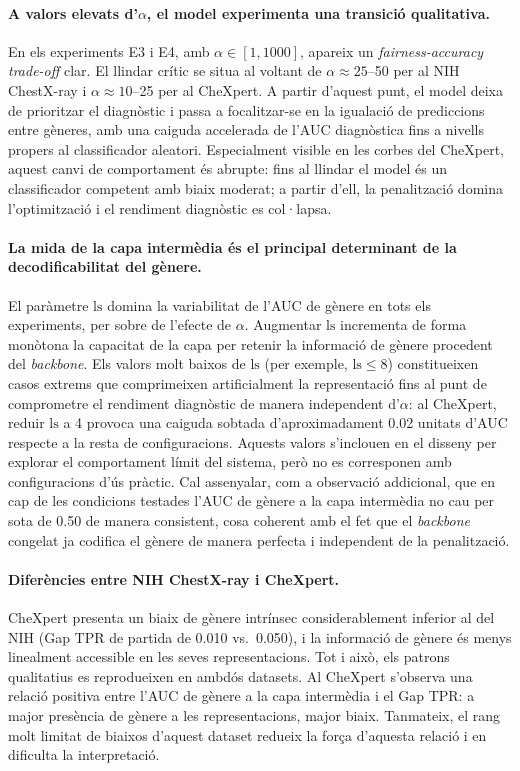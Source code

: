 \documentclass[a4paper,12pt,twoside]{ThesisStyle}
\begin{document}
\paragraph{A valors elevats d'$\alpha$, el model experimenta una transició qualitativa.}
En els experiments E3 i E4, amb $\alpha \in [1, 1000]$, apareix un \textit{fairness-accuracy trade-off} clar. El llindar crític se situa al voltant de $\alpha \approx 25$--50 per al NIH ChestX-ray i $\alpha \approx 10$--25 per al CheXpert. A partir d'aquest punt, el model deixa de prioritzar el diagnòstic i passa a focalitzar-se en la igualació de prediccions entre gèneres, amb una caiguda accelerada de l'AUC diagnòstica fins a nivells propers al classificador aleatori. Especialment visible en les corbes del CheXpert, aquest canvi de comportament és abrupte: fins al llindar el model és un classificador competent amb biaix moderat; a partir d'ell, la penalització domina l'optimització i el rendiment diagnòstic es col·lapsa.

\paragraph{La mida de la capa intermèdia és el principal determinant de la decodificabilitat del gènere.}
El paràmetre $\text{ls}$ domina la variabilitat de l'AUC de gènere en tots els experiments, per sobre de l'efecte de $\alpha$. Augmentar $\text{ls}$ incrementa de forma monòtona la capacitat de la capa per retenir la informació de gènere procedent del \textit{backbone}. Els valors molt baixos de $\text{ls}$ (per exemple, $\text{ls} \leq 8$) constitueixen casos extrems que comprimeixen artificialment la representació fins al punt de comprometre el rendiment diagnòstic de manera independent d'$\alpha$: al CheXpert, reduir $\text{ls}$ a 4 provoca una caiguda sobtada d'aproximadament 0.02 unitats d'AUC respecte a la resta de configuracions. Aquests valors s'inclouen en el disseny per explorar el comportament límit del sistema, però no es corresponen amb configuracions d'ús pràctic. Cal assenyalar, com a observació addicional, que en cap de les condicions testades l'AUC de gènere a la capa intermèdia no cau per sota de 0.50 de manera consistent, cosa coherent amb el fet que el \textit{backbone} congelat ja codifica el gènere de manera perfecta i independent de la penalització.

\paragraph{Diferències entre NIH ChestX-ray i CheXpert.}
CheXpert presenta un biaix de gènere intrínsec considerablement inferior al del NIH (Gap TPR de partida de 0.010 vs.\ 0.050), i la informació de gènere és menys linealment accessible en les seves representacions. Tot i això, els patrons qualitatius es reprodueixen en ambdós datasets. Al CheXpert s'observa una relació positiva entre l'AUC de gènere a la capa intermèdia i el Gap TPR: a major presència de gènere a les representacions, major biaix. Tanmateix, el rang molt limitat de biaixos d'aquest dataset redueix la força d'aquesta relació i en dificulta la interpretació.
\end{document}
